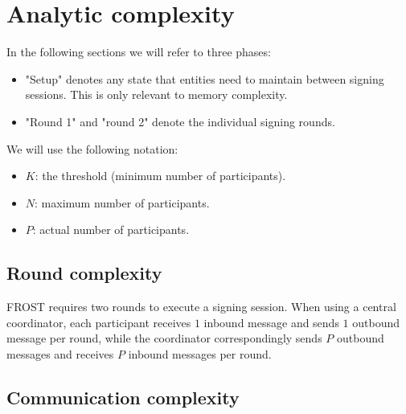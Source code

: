 
\section{Analytic complexity}\label{section:complexity}


In the following sections we will refer to three phases:
\begin{itemize}
	\item "Setup" denotes any state that entities need to maintain between
	signing sessions. This is only relevant to memory complexity.
	\item "Round 1" and "round 2" denote the individual signing rounds.
\end{itemize}

We will use the following notation:
\begin{itemize}
	\item $K$: the threshold (minimum number of participants).
	\item $N$: maximum number of participants.
	\item $P$: actual number of participants.
\end{itemize}

\subsection{Round complexity}

FROST requires two rounds to execute a signing session. When using a central
coordinator, each participant receives $1$ inbound message and sends $1$
outbound message per round, while the coordinator correspondingly sends $P$
outbound messages and receives $P$ inbound messages per round.

\subsection{Communication complexity}

